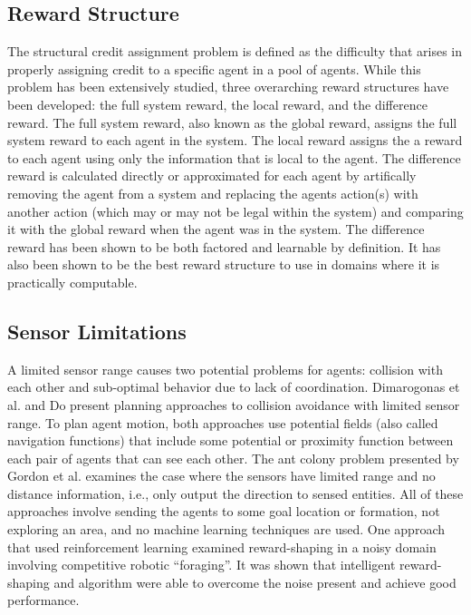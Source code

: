 \documentclass[letterpaper, 10 pt, conference]{ieeeconf}  %
\begin{document}
\subsection{Reward Structure}
The structural credit assignment problem is defined as the difficulty that arises in properly assigning credit 
to a specific agent in a pool of agents.  While this problem has been extensively studied, three overarching reward 
structures have been developed: the full system reward, the local reward, and the difference reward.  The full system reward, 
also known as the global reward, assigns the full system reward to each agent in the system.  The local reward assigns the a reward
to each agent using only the information that is local to the agent. The difference reward is calculated directly or approximated for each agent by artifically removing the agent from a system and replacing the agents action(s) with another action (which may or may not be legal within the system) and comparing it with the global reward when the agent was in the system. The difference reward has been shown to be both factored and learnable by definition. It has also been shown to be the best reward structure to use in
domains where it is practically computable.

\subsection{Sensor Limitations}
A limited sensor range causes two potential problems for agents:
collision with each other and sub-optimal behavior due to lack of
coordination. Dimarogonas et al. \cite{dimarogonas2007decentralized} and Do \cite{do2007bounded} present planning approaches to collision avoidance with limited sensor range. To plan agent motion, both approaches use potential fields (also called
navigation functions) that include some potential or proximity function between each pair of agents that can see each other. The ant colony problem presented by Gordon et al. \cite{gordon2004gathering} examines the case where the sensors have limited range and no distance information, i.e., only output the direction to sensed entities. All of these approaches involve sending the agents to some goal location or formation, not exploring an area, and no machine learning techniques are used. One approach that used reinforcement learning examined reward-shaping in a noisy domain involving competitive robotic “foraging”. It was shown that intelligent reward-shaping and algorithm were able to overcome the noise present and achieve good performance\cite{mataric1997reinforcement}.
\end{document}
